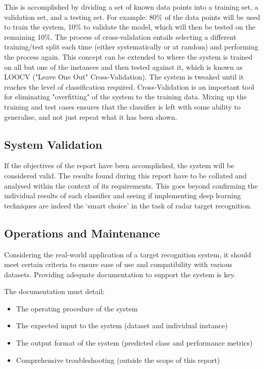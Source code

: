 This is accomplished by dividing a set of known data points into a training set, a validation set, and a testing set. For example: 80\% of the data points will be used to train the system, 10\% to validate the model, which will then be tested on the remaining 10\%. The process of cross-validation entails selecting a different training/test split each time (either systematically or at random) and performing the process again. This concept can be extended to where the system is trained on all but one of the instances and then tested against it, which is known as LOOCV ("Leave One Out" Cross-Validation). The system is tweaked until it reaches the level of classification required. Cross-Validation is an important tool for eliminating "overfitting" of the system to the training data. Mixing up the training and test cases ensures that the classifier is left with some ability to generalise, and not just repeat what it has been shown.

\subsection{System Validation}
If the objectives of the report have been accomplished, the system will be considered valid. The results found during this report have to be collated and analysed within the context of its requirements. This goes beyond confirming the individual results of each classifier and seeing if implementing deep learning techniques are indeed the `smart choice' in the task of radar target recognition. 

\subsection{Operations and Maintenance}

Considering the real-world application of a target recognition system, it should meet certain criteria to ensure ease of use and compatibility with various datasets. Providing adequate documentation to support the system is key. 

The documentation must detail:
\begin{itemize}
	\item The operating procedure of the system
	\item The expected input to the system (dataset and individual instance)
	\item The output format of the system (predicted class and performance metrics)
	\item Comprehensive troubleshooting (outside the scope of this report)
\end{itemize}



